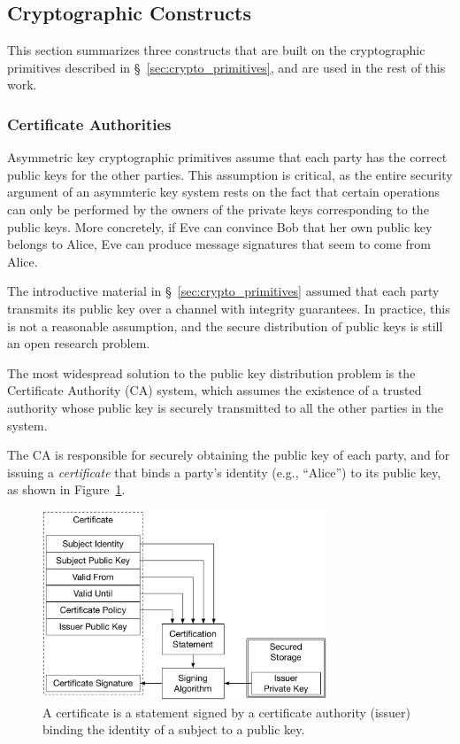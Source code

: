 \subsection{Cryptographic Constructs}
\label{sec:crypto_constructs}

This section summarizes three constructs that are built on the cryptographic
primitives described in \S~\ref{sec:crypto_primitives}, and are used in the
rest of this work.


\subsubsection{Certificate Authorities}

Asymmetric key cryptographic primitives assume that each party has the correct
public keys for the other parties. This assumption is critical, as the entire
security argument of an asymmteric key system rests on the fact that certain
operations can only be performed by the owners of the private keys
corresponding to the public keys. More concretely, if Eve can convince Bob
that her own public key belongs to Alice, Eve can produce message signatures
that seem to come from Alice.

The introductive material in \S~\ref{sec:crypto_primitives} assumed that each
party transmits its public key over a channel with integrity guarantees. In
practice, this is not a reasonable assumption, and the secure distribution of
public keys is still an open research problem.

The most widespread solution to the public key distribution problem is the
Certificate Authority (CA) system, which assumes the existence of a trusted
authority whose public key is securely transmitted to all the other parties in
the system.

The CA is responsible for securely obtaining the public key of each party, and
for issuing a \textit{certificate} that binds a party's identity (e.g.,
``Alice'') to its public key, as shown in Figure~\ref{fig:certificate}.

\begin{figure}[hbt]
  \centering
  \includegraphics[width=85mm]{figures/certificate.pdf}
  \caption{
    A certificate is a statement signed by a certificate authority (issuer)
    binding the identity of a subject to a public key.
  }
  \label{fig:certificate}
\end{figure}

